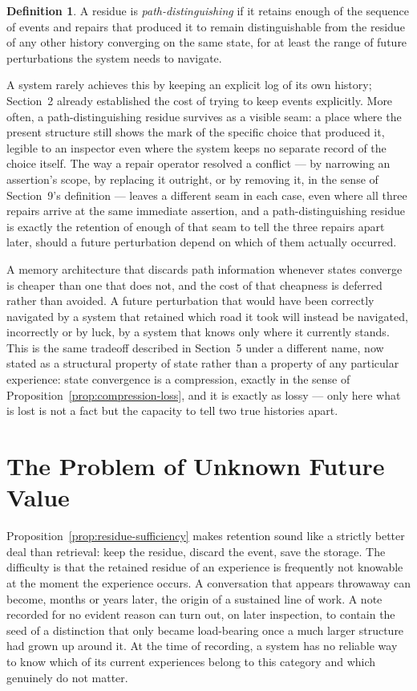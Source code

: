 \documentclass[11pt]{amsart}
\theoremstyle{plain}
\theoremstyle{definition}
\newtheorem{definition}[theorem]{Definition}
\theoremstyle{remark}
\begin{document}
\begin{definition}
A residue is \emph{path-distinguishing} if it retains enough of the
sequence of events and repairs that produced it to remain
distinguishable from the residue of any other history converging on the
same state, for at least the range of future perturbations the system
needs to navigate.
\end{definition}

A system rarely achieves this by keeping an explicit log of its own
history; Section~2 already established the cost of trying to keep
events explicitly. More often, a path-distinguishing residue survives
as a visible seam: a place where the present structure still shows the
mark of the specific choice that produced it, legible to an inspector
even where the system keeps no separate record of the choice itself.
The way a repair operator resolved a conflict --- by narrowing an
assertion's scope, by replacing it outright, or by removing it, in the
sense of Section~9's definition --- leaves a different seam in each
case, even where all three repairs arrive at the same immediate
assertion, and a path-distinguishing residue is exactly the retention of
enough of that seam to tell the three repairs apart later, should a
future perturbation depend on which of them actually occurred.

A memory architecture that discards path information whenever states
converge is cheaper than one that does not, and the cost of that
cheapness is deferred rather than avoided. A future perturbation that
would have been correctly navigated by a system that retained which
road it took will instead be navigated, incorrectly or by luck, by a
system that knows only where it currently stands. This is the same
tradeoff described in Section~5 under a different name, now stated as a
structural property of state rather than a property of any particular
experience: state convergence is a compression, exactly in the sense of
Proposition~\ref{prop:compression-loss}, and it is exactly as lossy ---
only here what is lost is not a fact but the capacity to tell two true
histories apart.

\section{The Problem of Unknown Future Value}

Proposition~\ref{prop:residue-sufficiency} makes retention sound like a
strictly better deal than retrieval: keep the residue, discard the
event, save the storage. The difficulty is that the retained residue of
an experience is frequently not knowable at the moment the experience
occurs. A conversation that appears throwaway can become, months or
years later, the origin of a sustained line of work. A note recorded
for no evident reason can turn out, on later inspection, to contain the
seed of a distinction that only became load-bearing once a much larger
structure had grown up around it. At the time of recording, a system
has no reliable way to know which of its current experiences belong to
this category and which genuinely do not matter.
\end{document}
